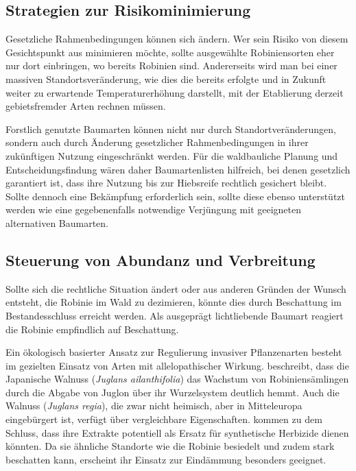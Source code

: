 \documentclass[twocolumn]{scrartcl}
\begin{document}
\subsection{Strategien zur Risikominimierung}

Gesetzliche Rahmenbedingungen können sich ändern. Wer sein Risiko von
diesem Gesichtspunkt aus minimieren möchte, sollte ausgewählte
Robiniensorten eher nur dort einbringen, wo bereits Robinien
sind. Andererseits wird man bei einer massiven Standortsveränderung,
wie dies die bereits erfolgte und in Zukunft weiter zu erwartende
Temperaturerhöhung darstellt, mit der Etablierung derzeit
gebietsfremder Arten rechnen müssen.

Forstlich genutzte Baumarten können nicht nur durch
Standortveränderungen, sondern auch durch Änderung gesetzlicher
Rahmenbedingungen in ihrer zukünftigen Nutzung eingeschränkt
werden. Für die waldbauliche Planung und Entscheidungsfindung wären
daher Baumartenlisten hilfreich, bei denen gesetzlich garantiert ist,
dass ihre Nutzung bis zur Hiebsreife rechtlich gesichert
bleibt. Sollte dennoch eine Bekämpfung erforderlich sein, sollte diese
ebenso unterstützt werden wie eine gegebenenfalls notwendige
Verjüngung mit geeigneten alternativen Baumarten.

\subsection{Steuerung von Abundanz und Verbreitung}

Sollte sich die rechtliche Situation ändert oder aus anderen Gründen
der Wunsch entsteht, die Robinie im Wald zu dezimieren, könnte dies
durch Beschattung im Bestandesschluss erreicht werden. Als ausgeprägt
lichtliebende Baumart reagiert die Robinie empfindlich auf
Beschattung.

Ein ökologisch basierter Ansatz zur Regulierung invasiver
Pflanzenarten besteht im gezielten Einsatz von Arten mit
allelopathischer Wirkung. \citet{jung2010robinie} beschreibt, dass die
Japanische Walnuss (\emph{Juglans ailanthifolia}) das Wachstum von
Robiniensämlingen durch die Abgabe von Juglon über ihr Wurzelsystem
deutlich hemmt. Auch die Walnuss (\emph{Juglans regia}), die zwar
nicht heimisch, aber in Mitteleuropa eingebürgert ist, verfügt über
vergleichbare Eigenschaften. \citet{dordevic2022nussAllelopathi}
kommen zu dem Schluss, dass ihre Extrakte potentiell als Ersatz für
synthetische Herbizide dienen könnten. Da sie ähnliche Standorte wie
die Robinie besiedelt und zudem stark beschatten kann, erscheint ihr
Einsatz zur Eindämmung besonders geeignet.
\end{document}
